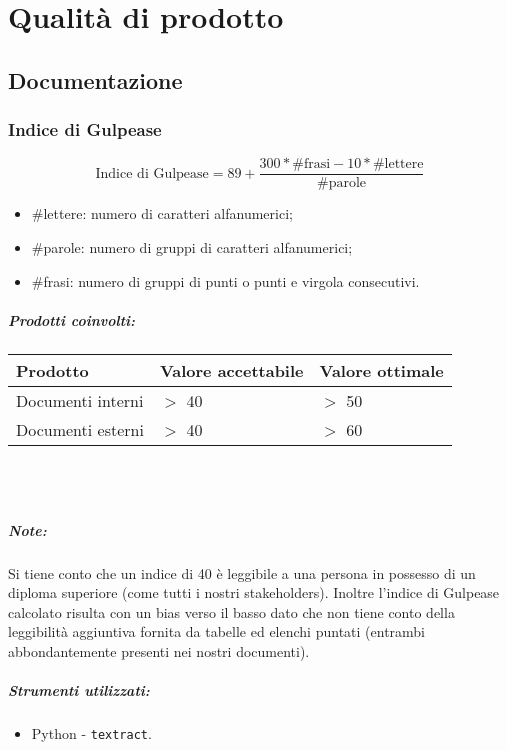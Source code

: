 \documentclass[a4paper, 12pt]{article}
\begin{document}
\makefrontpage

\makeversioni

\tableofcontents
\clearpage

\section{Qualità di prodotto}

\subsection{Documentazione}
\subsubsection{Indice di Gulpease}
\[ \text{Indice di Gulpease} = 89 + \frac{300*\text{\#frasi} - 10*\text{\#lettere}}{\text{\#parole}} \]
\begin{itemize}
	\item \#lettere: numero di caratteri alfanumerici;
	\item \#parole: numero di gruppi di caratteri alfanumerici;
	\item \#frasi: numero di gruppi di punti o punti e virgola consecutivi.
\end{itemize}

\subparagraph{Prodotti coinvolti:}
\begin{center}
	\begin{tabularx}{\textwidth}{|X|X|X|}
		\hline
		\textbf{Prodotto} & \textbf{Valore accettabile} & \textbf{Valore ottimale } \\
		\hline
		Documenti interni & $>$ 40                      & $>$ 50                    \\
		\hline
		Documenti esterni & $>$ 40                      & $>$ 60                    \\
		\hline
	\end{tabularx}\\[8pt]
	\mbox{}\\
\end{center}
\subparagraph{Note:}
Si tiene conto che un indice di 40 è leggibile a una persona in possesso di un diploma superiore (come tutti i nostri stakeholders).
Inoltre l'indice di Gulpease calcolato risulta con un bias verso il basso dato che non tiene conto della leggibilità aggiuntiva fornita da tabelle ed elenchi puntati
(entrambi abbondantemente presenti nei nostri documenti).

\subparagraph{Strumenti utilizzati:}
\begin{itemize}
	\item Python - \texttt{textract}.
\end{itemize}
\end{document}
